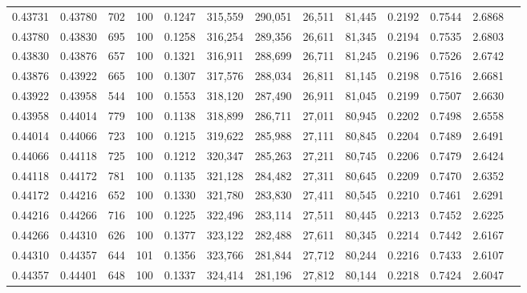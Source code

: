 \begin{tabular}{rrrrrrrrrrrrr}
0.43731 & 0.43780 &   702 & 100 &                                     0.1247 & 315,559 & 290,051 &  26,511 &  81,445 & 0.2192 & 0.7544 & 2.6868 \\
0.43780 & 0.43830 &   695 & 100 &                                     0.1258 & 316,254 & 289,356 &  26,611 &  81,345 & 0.2194 & 0.7535 & 2.6803 \\
0.43830 & 0.43876 &   657 & 100 &                                     0.1321 & 316,911 & 288,699 &  26,711 &  81,245 & 0.2196 & 0.7526 & 2.6742 \\
0.43876 & 0.43922 &   665 & 100 &                                     0.1307 & 317,576 & 288,034 &  26,811 &  81,145 & 0.2198 & 0.7516 & 2.6681 \\
0.43922 & 0.43958 &   544 & 100 &                                     0.1553 & 318,120 & 287,490 &  26,911 &  81,045 & 0.2199 & 0.7507 & 2.6630 \\
0.43958 & 0.44014 &   779 & 100 &                                     0.1138 & 318,899 & 286,711 &  27,011 &  80,945 & 0.2202 & 0.7498 & 2.6558 \\
0.44014 & 0.44066 &   723 & 100 &                                     0.1215 & 319,622 & 285,988 &  27,111 &  80,845 & 0.2204 & 0.7489 & 2.6491 \\
0.44066 & 0.44118 &   725 & 100 &                                     0.1212 & 320,347 & 285,263 &  27,211 &  80,745 & 0.2206 & 0.7479 & 2.6424 \\
0.44118 & 0.44172 &   781 & 100 &                                     0.1135 & 321,128 & 284,482 &  27,311 &  80,645 & 0.2209 & 0.7470 & 2.6352 \\
0.44172 & 0.44216 &   652 & 100 &                                     0.1330 & 321,780 & 283,830 &  27,411 &  80,545 & 0.2210 & 0.7461 & 2.6291 \\
0.44216 & 0.44266 &   716 & 100 &                                     0.1225 & 322,496 & 283,114 &  27,511 &  80,445 & 0.2213 & 0.7452 & 2.6225 \\
0.44266 & 0.44310 &   626 & 100 &                                     0.1377 & 323,122 & 282,488 &  27,611 &  80,345 & 0.2214 & 0.7442 & 2.6167 \\
0.44310 & 0.44357 &   644 & 101 &                                     0.1356 & 323,766 & 281,844 &  27,712 &  80,244 & 0.2216 & 0.7433 & 2.6107 \\
0.44357 & 0.44401 &   648 & 100 &                                     0.1337 & 324,414 & 281,196 &  27,812 &  80,144 & 0.2218 & 0.7424 & 2.6047 \\

\end{tabular}
